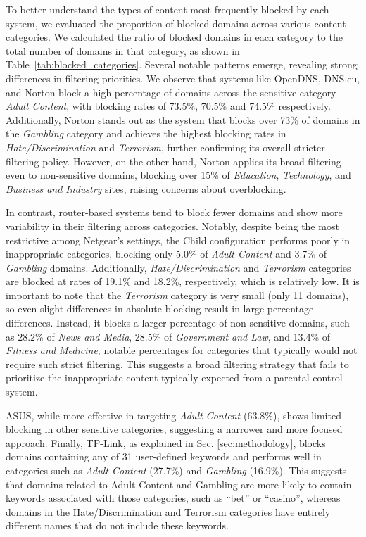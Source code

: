 To better understand the types of content most frequently blocked by each system, we evaluated the proportion of blocked domains across various content categories. We calculated the ratio of blocked domains in each category to the total number of domains in that category, as shown in Table~\ref{tab:blocked_categories}. Several notable patterns emerge, revealing strong differences in filtering priorities. We observe that systems like OpenDNS, DNS.eu, and Norton block a high percentage of domains across the sensitive category \emph{Adult Content}, with blocking rates of 73.5\%, 70.5\% and 74.5\% respectively. Additionally, Norton stands out as the system that blocks over 73\% of domains in the \emph{Gambling} category and achieves the highest blocking rates in \emph{Hate/Discrimination} and \emph{Terrorism}, further confirming its overall stricter filtering policy. 
However, on the other hand, Norton applies its broad filtering even to non-sensitive domains, blocking over 15\% of \emph{Education}, \emph{Technology}, and \emph{Business and Industry} sites, raising concerns about overblocking.

In contrast, router-based systems tend to block fewer domains and show more variability in their filtering across categories.
Notably, despite being the most restrictive among Netgear's settings, the Child configuration performs poorly in inappropriate categories, blocking only 5.0\% of \emph{Adult Content} and 3.7\% of \emph{Gambling} domains. Additionally, \emph{Hate/Discrimination} and \emph{Terrorism} categories are blocked at rates of 19.1\% and 18.2\%, respectively, which is relatively low. It is important to note that the \emph{Terrorism} category is very small (only 11 domains), so even slight differences in absolute blocking result in large percentage differences.
Instead, it blocks a larger percentage of non-sensitive domains, such as 28.2\% of \emph{News and Media}, 28.5\% of \emph{Government and Law}, and 13.4\% of \emph{Fitness and Medicine}, notable percentages for categories that typically would not require such strict filtering. This suggests a broad filtering strategy that fails to prioritize the inappropriate content typically expected from a parental control system.


ASUS, while more effective in targeting \emph{Adult Content} (63.8\%), shows limited blocking in other sensitive categories, suggesting a narrower and more focused approach.
Finally, TP-Link, as explained in Sec. \ref{sec:methodology}, blocks domains containing any of 31 user-defined keywords and performs well in categories such as \emph{Adult Content} (27.7\%) and \emph{Gambling} (16.9\%). This suggests that domains related to Adult Content and Gambling are more likely to contain keywords associated with those categories, such as ``bet''  or ``casino'', whereas domains in the Hate/Discrimination and Terrorism categories have entirely different names that do not include these keywords.

